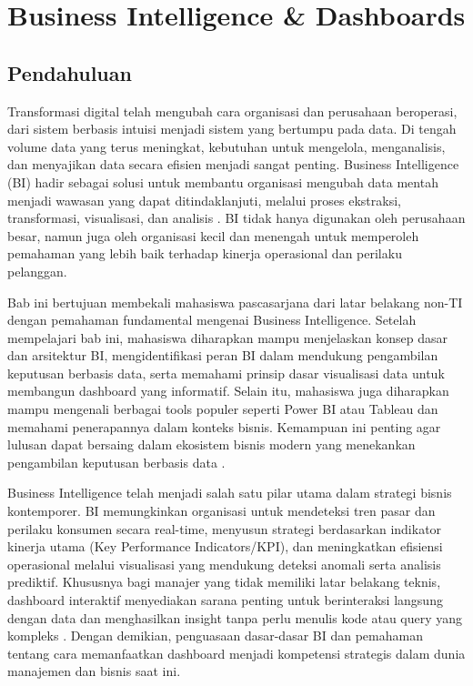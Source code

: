 \chapter{Business Intelligence \& Dashboards}

\section{Pendahuluan}

Transformasi digital telah mengubah cara organisasi dan perusahaan beroperasi, dari sistem berbasis intuisi menjadi sistem yang bertumpu pada data. Di tengah volume data yang terus meningkat, kebutuhan untuk mengelola, menganalisis, dan menyajikan data secara efisien menjadi sangat penting. Business Intelligence (BI) hadir sebagai solusi untuk membantu organisasi mengubah data mentah menjadi wawasan yang dapat ditindaklanjuti, melalui proses ekstraksi, transformasi, visualisasi, dan analisis \cite{liao2021business}. BI tidak hanya digunakan oleh perusahaan besar, namun juga oleh organisasi kecil dan menengah untuk memperoleh pemahaman yang lebih baik terhadap kinerja operasional dan perilaku pelanggan.

Bab ini bertujuan membekali mahasiswa pascasarjana dari latar belakang non-TI dengan pemahaman fundamental mengenai Business Intelligence. Setelah mempelajari bab ini, mahasiswa diharapkan mampu menjelaskan konsep dasar dan arsitektur BI, mengidentifikasi peran BI dalam mendukung pengambilan keputusan berbasis data, serta memahami prinsip dasar visualisasi data untuk membangun dashboard yang informatif. Selain itu, mahasiswa juga diharapkan mampu mengenali berbagai tools populer seperti Power BI atau Tableau dan memahami penerapannya dalam konteks bisnis. Kemampuan ini penting agar lulusan dapat bersaing dalam ekosistem bisnis modern yang menekankan pengambilan keputusan berbasis data \cite{lim2023adoption}.

Business Intelligence telah menjadi salah satu pilar utama dalam strategi bisnis kontemporer. BI memungkinkan organisasi untuk mendeteksi tren pasar dan perilaku konsumen secara real-time, menyusun strategi berdasarkan indikator kinerja utama (Key Performance Indicators/KPI), dan meningkatkan efisiensi operasional melalui visualisasi yang mendukung deteksi anomali serta analisis prediktif. Khususnya bagi manajer yang tidak memiliki latar belakang teknis, dashboard interaktif menyediakan sarana penting untuk berinteraksi langsung dengan data dan menghasilkan insight tanpa perlu menulis kode atau query yang kompleks \cite{schieder2011decision}. Dengan demikian, penguasaan dasar-dasar BI dan pemahaman tentang cara memanfaatkan dashboard menjadi kompetensi strategis dalam dunia manajemen dan bisnis saat ini.



